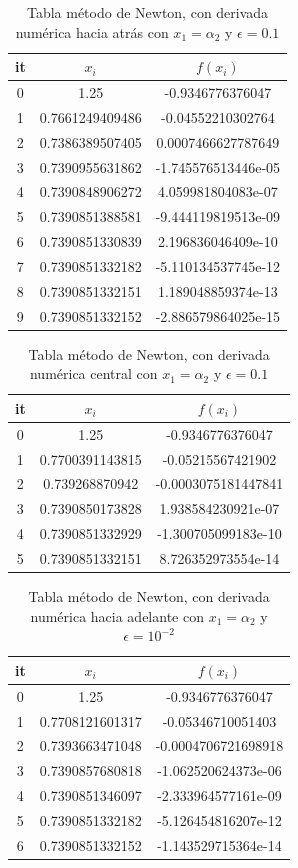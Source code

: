 \documentclass{article} %
\begin{document}
\begin{table}[H]
\centering
\begin{tabular}{|c|c|c|}
\hline
it & $x_i$ & $f(x_i)$\\
\hline
0 & 1.25 & -0.9346776376047\\
1 & 0.7661249409486 & -0.04552210302764\\
2 & 0.7386389507405 & 0.0007466627787649\\
3 & 0.7390955631862 & -1.745576513446e-05\\
4 & 0.7390848906272 & 4.059981804083e-07\\
5 & 0.7390851388581 & -9.444119819513e-09\\
6 & 0.7390851330839 & 2.196836046409e-10\\
7 & 0.7390851332182 & -5.110134537745e-12\\
8 & 0.7390851332151 & 1.189048859374e-13\\
9 & 0.7390851332152 & -2.886579864025e-15\\
\hline
\end{tabular}
\caption{Tabla método de Newton, con derivada numérica hacia atrás con $x_1 = \alpha_2$ y $\epsilon = 0.1$}
\end{table}

\begin{table}[H]
\centering
\begin{tabular}{|c|c|c|}
\hline
it & $x_i$ & $f(x_i)$\\
\hline
0 & 1.25 & -0.9346776376047\\
1 & 0.7700391143815 & -0.05215567421902\\
2 & 0.739268870942 & -0.0003075181447841\\
3 & 0.7390850173828 & 1.938584230921e-07\\
4 & 0.7390851332929 & -1.300705099183e-10\\
5 & 0.7390851332151 & 8.726352973554e-14\\
\hline
\end{tabular}
\caption{Tabla método de Newton, con derivada numérica central con $x_1 = \alpha_2$ y $\epsilon = 0.1$}
\end{table}


\begin{table}[H]
\centering
\begin{tabular}{|c|c|c|}
\hline
it & $x_i$ & $f(x_i)$\\
\hline
0 & 1.25 & -0.9346776376047\\
1 & 0.7708121601317 & -0.05346710051403\\
2 & 0.7393663471048 & -0.0004706721698918\\
3 & 0.7390857680818 & -1.062520624373e-06\\
4 & 0.7390851346097 & -2.333964577161e-09\\
5 & 0.7390851332182 & -5.126454816207e-12\\
6 & 0.7390851332152 & -1.143529715364e-14\\
\hline
\end{tabular}
\caption{Tabla método de Newton, con derivada numérica hacia adelante con $x_1 = \alpha_2$ y $\epsilon = 10^{-2}$}
\end{table}
\end{document}
